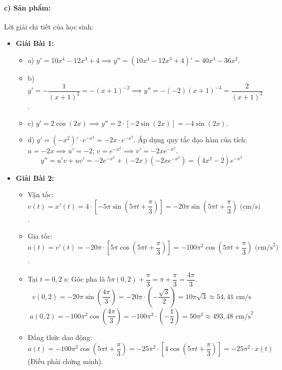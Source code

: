 \documentclass[12pt, a4paper]{article}
\begin{document}
\paragraph{c) Sản phẩm:} Lời giải chi tiết của học sinh:
\begin{itemize}[leftmargin=0.8cm]
    \item \textbf{Giải Bài 1:}
    \begin{itemize}[leftmargin=0.4cm]
        \item a) $y' = 10x^4 - 12x^3 + 4 \implies y'' = (10x^4 - 12x^3 + 4)' = 40x^3 - 36x^2$.
        \item b) $y' = -\dfrac{1}{(x + 1)^2} = -(x + 1)^{-2} \implies y'' = -(-2)(x + 1)^{-3} = \dfrac{2}{(x + 1)^3}$.
        \item c) $y' = 2\cos(2x) \implies y'' = 2 \cdot [-2\sin(2x)] = -4\sin(2x)$.
        \item d) $y' = (-x^2)' \cdot e^{-x^2} = -2x \cdot e^{-x^2}$.
        Áp dụng quy tắc đạo hàm của tích: $u = -2x \implies u' = -2$; $v = e^{-x^2} \implies v' = -2x e^{-x^2}$.
        $$y'' = u'v + uv' = -2 e^{-x^2} + (-2x)(-2x e^{-x^2}) = (4x^2 - 2) e^{-x^2}$$
    \end{itemize}
    \item \textbf{Giải Bài 2:}
    \begin{itemize}[leftmargin=0.4cm]
        \item Vận tốc: $v(t) = x'(t) = 4 \cdot \left[ -5\pi \sin\left(5\pi t + \dfrac{\pi}{3}\right) \right] = -20\pi \sin\left(5\pi t + \dfrac{\pi}{3}\right)\text{ (cm/s)}$.
        \item Gia tốc: $a(t) = v'(t) = -20\pi \cdot \left[ 5\pi \cos\left(5\pi t + \dfrac{\pi}{3}\right) \right] = -100\pi^2 \cos\left(5\pi t + \dfrac{\pi}{3}\right)\text{ (cm/s}^2\text{)}$.
        \item Tại $t = 0{,}2\text{ s}$: Góc pha là $5\pi(0{,}2) + \dfrac{\pi}{3} = \pi + \dfrac{\pi}{3} = \dfrac{4\pi}{3}$.
        $$v(0{,}2) = -20\pi \sin\left(\dfrac{4\pi}{3}\right) = -20\pi \cdot \left(-\dfrac{\sqrt{3}}{2}\right) = 10\pi\sqrt{3} \approx 54{,}41\text{ cm/s}$$
        $$a(0{,}2) = -100\pi^2 \cos\left(\dfrac{4\pi}{3}\right) = -100\pi^2 \cdot \left(-\dfrac{1}{2}\right) = 50\pi^2 \approx 493{,}48\text{ cm/s}^2$$
        \item Đẳng thức dao động: $a(t) = -100\pi^2 \cos\left(5\pi t + \dfrac{\pi}{3}\right) = -25\pi^2 \cdot \left[ 4\cos\left(5\pi t + \dfrac{\pi}{3}\right) \right] = -25\pi^2 \cdot x(t)$ (Điều phải chứng minh).
    \end{itemize}
\end{itemize}
\end{document}
